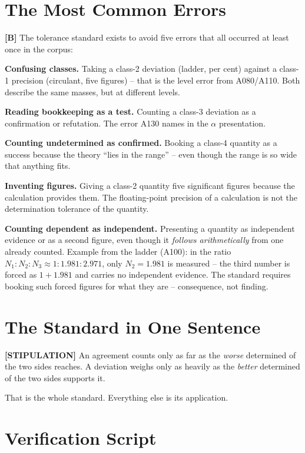 \section{The Most Common Errors}

\textbf{[B]} The tolerance standard exists to avoid five errors that all occurred
at least once in the corpus:

\textbf{Confusing classes.} Taking a class-2 deviation (ladder, per cent) against
a class-1 precision (circulant, five figures) -- that is the level error from
A080/A110. Both describe the same masses, but at different levels.

\textbf{Reading bookkeeping as a test.} Counting a class-3 deviation as a
confirmation or refutation. The error A130 names in the $\alpha$ presentation.

\textbf{Counting undetermined as confirmed.} Booking a class-4 quantity as a
success because the theory ``lies in the range'' -- even though the range is so
wide that anything fits.

\textbf{Inventing figures.} Giving a class-2 quantity five significant figures
because the calculation provides them. The floating-point precision of a
calculation is not the determination tolerance of the quantity.

\textbf{Counting dependent as independent.} Presenting a quantity as independent
evidence or as a second figure, even though it \emph{follows arithmetically} from
one already counted. Example from the ladder (A100): in the ratio
$N_1{:}N_2{:}N_3 \approx 1{:}1{.}981{:}2{.}971$, only $N_2=1{.}981$ is measured
-- the third number is forced as $1 + 1{.}981$ and carries no independent evidence.
The standard requires booking such forced figures for what they are -- consequence,
not finding.

\section{The Standard in One Sentence}

\textbf{[STIPULATION]} An agreement counts only as far as the \emph{worse}
determined of the two sides reaches. A deviation weighs only as heavily as the
\emph{better} determined of the two sides supports it.

That is the whole standard. Everything else is its application.

\section{Verification Script}


